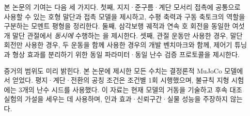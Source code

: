 본 논문의 기여는 다음 세 가지다. 첫째, 지지·준구름·계단 모서리 접촉에 공통으로
사용할 수 있는 호형 말단과 접촉 모델을 제시하고, 수평 축력과 구동 축토크의
역할을 구분하는 모멘트 평형을 정리한다. 둘째, 삼각보행 궤적과 연속 호 회전을
동일한 여섯 개 말단 관절에서 \emph{동시에} 수행하는 \gaitname{}을 제시한다.
셋째, 관절 운동만 사용한 경우, 말단 회전만 사용한 경우, 두 운동을 함께 사용한
경우의 개발 벤치마크와 함께, 제어기 튜닝과 형상 효과를 분리하기 위한 동일
파라미터·동일 난수 검증 프로토콜을 제시한다.

증거의 범위도 미리 밝힌다. 본 논문에 제시한 모든 수치는 결정론적 MuJoCo 모델에서
얻었다. 평지·계단·전환의 공칭 조건은 조건별 1회 시행했으며, 불규칙 지형 시험에는
3개의 난수 시드를 사용했다. 이 자료는 현재 모델의 거동을 기술하고 후속 대조
실험의 가설을 세우는 데 사용하며, 인과 효과·신뢰구간·실물 성능을 주장하지 않는다.
